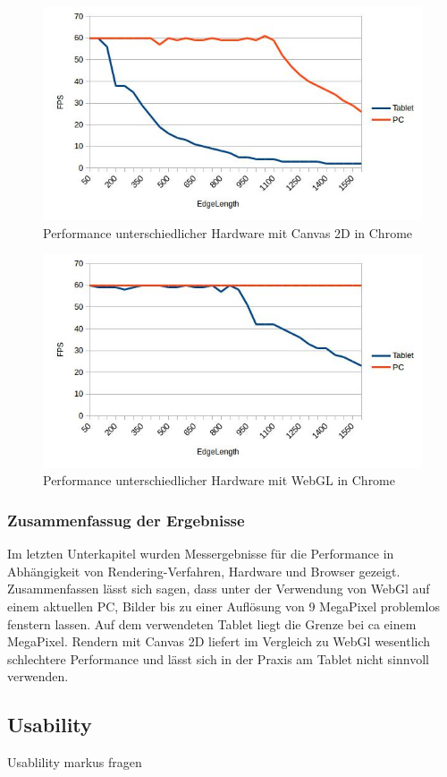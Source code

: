 \begin{figure}[pt]
	\centering
	\includegraphics[width=0.7\linewidth]{img/c4_stat_hardware_js_chrome.jpg}
	\caption{Performance unterschiedlicher Hardware mit Canvas 2D in Chrome}
	\label{fig:stat_hardware_js_chrome}
\end{figure}

\begin{figure}[pt]
	\centering
	\includegraphics[width=0.7\linewidth]{img/c4_stat_hardware_webgl_chrome.jpg}
	\caption{Performance unterschiedlicher Hardware mit WebGL in Chrome}
	\label{fig:stat_hardware_webgl_chrome}
\end{figure}

\subsubsection{Zusammenfassug der Ergebnisse}
Im letzten Unterkapitel wurden Messergebnisse für die Performance in Abhängigkeit von Rendering-Verfahren, Hardware und Browser gezeigt.
Zusammenfassen lässt sich sagen, 
dass unter der Verwendung von WebGl auf einem aktuellen PC, 
Bilder bis zu einer Auflösung von 9 MegaPixel problemlos fenstern lassen.
Auf dem verwendeten Tablet liegt die Grenze bei ca einem MegaPixel.
Rendern mit Canvas 2D liefert im Vergleich zu WebGl wesentlich schlechtere Performance und lässt sich in der Praxis am Tablet nicht sinnvoll verwenden.


\subsection{Usability}
\label{sec:Usability}
Usablility
markus fragen
